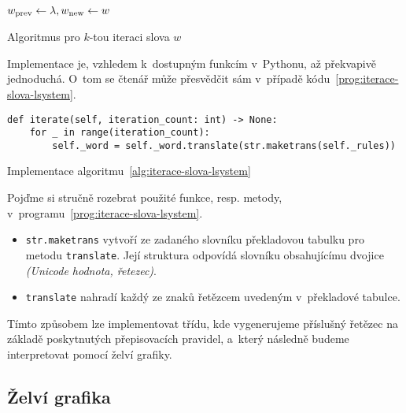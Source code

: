 \begin{algorithm}[h]
    $w_{\textup{prev}}\gets\lambda,w_{\textup{new}}\gets w$\;
    \;
    \caption{Algoritmus pro $k$-tou iteraci slova $w$}
    \label{alg:iterace-slova-lsystem}
\end{algorithm}
Implementace je, vzhledem k~dostupným funkcím v~Pythonu, až překvapivě jednoduchá. O~tom se čtenář může přesvědčit sám v~případě kódu~\ref{prog:iterace-slova-lsystem}.
\begin{program}[h]
\begin{lstlisting}[style=python]
def iterate(self, iteration_count: int) -> None:
    for _ in range(iteration_count):
        self._word = self._word.translate(str.maketrans(self._rules))
\end{lstlisting}
    \caption{Implementace algoritmu~\ref{alg:iterace-slova-lsystem}}
    \label{prog:iterace-slova-lsystem}
\end{program}
Pojďme si stručně rozebrat použité funkce, resp. metody, v~programu~\ref{prog:iterace-slova-lsystem}.
\begin{itemize}
    \item \texttt{str.maketrans} vytvoří ze zadaného slovníku překladovou tabulku pro metodu \texttt{translate}. Její struktura odpovídá slovníku obsahujícímu dvojice \emph{(Unicode hodnota, řetezec)}.
    \item \texttt{translate} nahradí každý ze znaků řetězcem uvedeným v~překladové tabulce.
\end{itemize}
Tímto způsobem lze implementovat třídu, kde vygenerujeme příslušný řetězec na základě poskytnutých přepisovacích pravidel, a~který následně budeme interpretovat pomocí želví grafiky.

\subsection{Želví grafika}\label{subsec:implementace-zelvi-grafiky}

